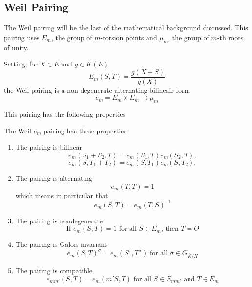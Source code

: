 \subsection{Weil Pairing}
The Weil pairing will be the last of the mathematical background discussed. This pairing uses $E_m$, the group of $m$-torsion points and $\mu_m$, the group of $m$-th roots of unity.
\begin{defn}
	Setting, for $X\in E$ and $g\in\bar{K}(E)$
	\begin{equation*}
	E_m(S,T)=\frac{g(X+S)}{g(X)}
	\end{equation*}
	the Weil pairing is a non-degenerate alternating bilineair form
	\begin{equation*}
	e_m=E_m\times E_m\to\mu_m
	\end{equation*}
\end{defn}
This pairing has the following properties
\begin{thm}
	The Weil $e_m$ pairing has these properties
	\begin{enumerate}
		\item The pairing is bilinear
		\begin{equation*}
		e_m(S_1+S_2,T)=e_m(S_1,T)e_m(S_2,T),
		\end{equation*}
		\begin{equation*}
		e_m(S,T_1+T_2)=e_m(S,T_1)e_m(S,T_2),
		\end{equation*}
		\item The pairing is alternating
		\begin{equation*}
		e_m(T,T)=1
		\end{equation*}
		which means in particular that
		\begin{equation*}
		e_m(S,T)=e_m(T,S)^{-1}
		\end{equation*}
		\item The pairing is nondegenerate
		\begin{equation*}
		\text{If } e_m(S,T)=1\text{ for all } S\in E_m\text{, then } T=O
		\end{equation*}
		\item The pairing is Galois invariant
		\begin{equation*}
		e_m(S,T)^\sigma=e_m(S^\sigma,T^\sigma)\text{ for all }\sigma\in G_{\bar{K}/K}
		\end{equation*}
		\item The pairing is compatible
		\begin{equation*}
		e_{mm'}(S,T)=e_m(m'S,T)\text{ for all }S\in E_{mm'}\text{ and }T\in E_m
		\end{equation*}
	\end{enumerate}
\end{thm}

